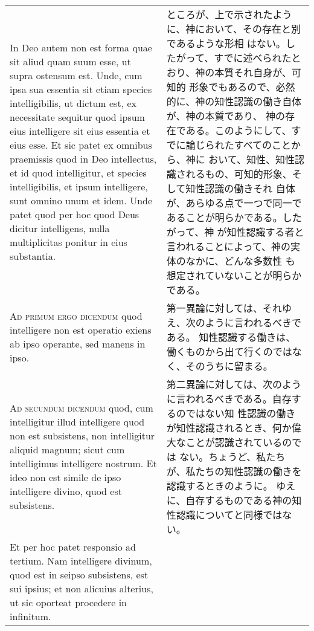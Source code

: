 \documentclass[10pt]{jsarticle} %
\begin{document}
\begin{longtable}{p{21em}p{21em}}
\\

In Deo autem non est forma quae sit aliud quam suum esse, ut supra
ostensum est.  Unde, cum ipsa sua essentia sit etiam species
intelligibilis, ut dictum est, ex necessitate sequitur quod ipsum eius
intelligere sit eius essentia et eius esse. Et sic patet ex omnibus
praemissis quod in Deo intellectus, et id quod intelligitur, et
species intelligibilis, et ipsum intelligere, sunt omnino unum et
idem. Unde patet quod per hoc quod Deus dicitur intelligens, nulla
multiplicitas ponitur in eius substantia.

&

ところが、上で示されたように、神において、その存在と別であるような形相
はない。したがって、すでに述べられたとおり、神の本質それ自身が、可知的
形象でもあるので、必然的に、神の知性認識の働き自体が、神の本質であり、
神の存在である。このようにして、すでに論じられたすべてのことから、神に
おいて、知性、知性認識されるもの、可知的形象、そして知性認識の働きそれ
自体が、あらゆる点で一つで同一であることが明らかである。したがって、神
が知性認識する者と言われることによって、神の実体のなかに、どんな多数性
も想定されていないことが明らかである。

\\


{\scshape Ad primum ergo dicendum} quod intelligere non
est operatio exiens ab ipso operante, sed manens in ipso.

&

第一異論に対しては、それゆえ、次のように言われるべきである。
知性認識する働きは、働くものから出て行くのではなく、そのうちに留まる。


\\


{\scshape Ad secundum dicendum} quod, cum intelligitur
illud intelligere quod non est subsistens, non intelligitur aliquid
magnum; sicut cum intelligimus intelligere nostrum. Et ideo non est
simile de ipso intelligere divino, quod est subsistens.

&

第二異論に対しては、次のように言われるべきである。自存するのではない知
性認識の働きが知性認識されるとき、何か偉大なことが認識されているのでは
ない。ちょうど、私たちが、私たちの知性認識の働きを認識するときのように。
ゆえに、自存するものである神の知性認識についてと同様ではない。


\\


Et per hoc patet responsio ad tertium. Nam intelligere divinum, quod
est in seipso subsistens, est sui ipsius; et non alicuius alterius, ut
sic oporteat procedere in infinitum.


\end{longtable}
\end{document}
